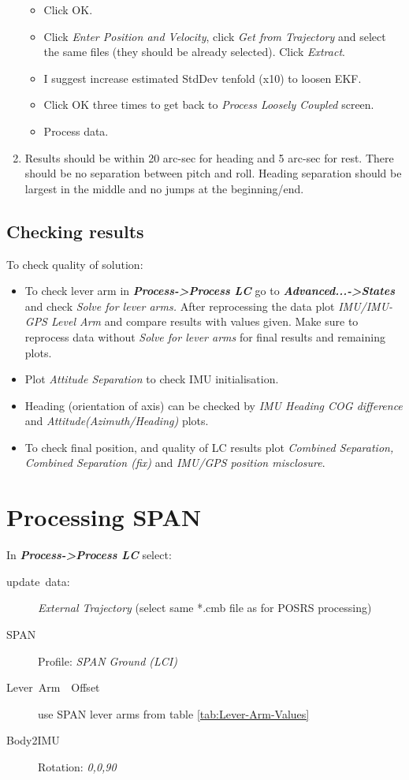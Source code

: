 \documentclass[11pt,fleqn]{book} %
\begin{document}
\begin{enumerate}
\begin{itemize}
		\item Click OK.
		\item Click \emph{Enter Position and Velocity}, click \emph{ Get from Trajectory} and select the same files (they should be already selected). Click \emph{Extract}.
		\item I suggest increase estimated StdDev tenfold (x10) to loosen EKF. 
		\item Click OK three times to get back to \emph{Process Loosely Coupled} screen.
		\item Process data.
	\end{itemize}
	\item Results should be within 20 arc-sec for heading and 5 arc-sec for rest. There should be no separation between pitch and roll. Heading separation should be largest in the middle and no jumps at the beginning/end. 
\end{enumerate}

\subsection{Checking results}

To check quality of solution:

\begin{itemize}
	\item To check lever arm in \textbf{\emph{Process->Process LC}} go to \textbf{\emph{Advanced...->States }}and check\emph{ Solve for lever arms. }After reprocessing the data plot\emph{ IMU/IMU-GPS Level Arm} and compare results with values given. Make sure to reprocess data without \emph{Solve for lever arms }for final results and remaining plots.
	\item Plot \emph{Attitude Separation} to check IMU initialisation.
	\item Heading (orientation of axis) can be checked by \emph{IMU Heading COG difference} and \emph{Attitude(Azimuth/Heading)} plots.
	\item To check final position, and quality of LC results plot \emph{Combined Separation, Combined Separation (fix)} and\emph{ IMU/GPS position misclosure}. 
\end{itemize}

\section{Processing SPAN}\label{sub:Processing-SPAN}

In \textbf{\emph{Process->Process LC}} select:
\begin{description}
	\item [{update~data:}] \emph{External Trajectory }(select same {*}.cmb
	file as for POSRS processing)
	\item [{SPAN}] Profile: \emph{SPAN Ground (LCI) }
	\item [{Lever~Arm~~Offset}] use SPAN lever arms from table \ref{tab:Lever-Arm-Values}
	\item [{Body2IMU}] Rotation: \emph{0,0,90}
\end{description}
\end{document}
